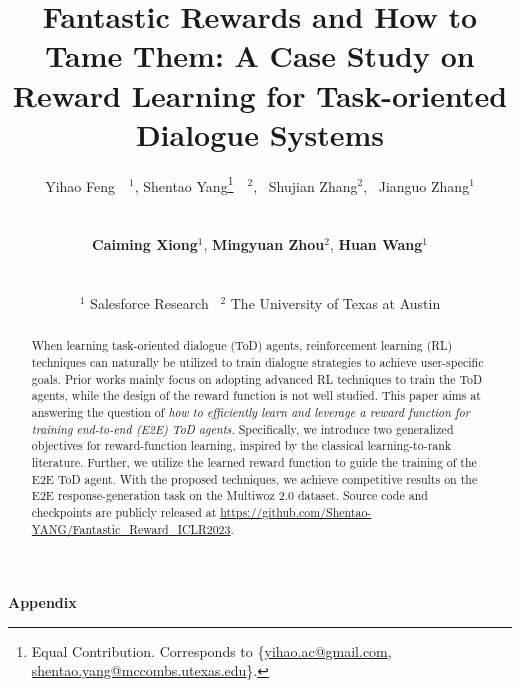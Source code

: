 \documentclass[dvipsnames]{article} %
\title{Fantastic Rewards and How to Tame Them:
A Case Study on Reward Learning for Task-oriented Dialogue Systems}
\author{
\centerline{Yihao Feng\footnotemark[1]~~$^1$, Shentao Yang\thanks{Equal Contribution. Corresponds to \{\href{mailto:yihao.ac@gmail.com}{yihao.ac@gmail.com}, \href{mailto:shentao.yang@mccombs.utexas.edu}{shentao.yang@mccombs.utexas.edu}\}.}~~$^2$,~ Shujian Zhang$^2$,~ Jianguo Zhang$^1$} \\
\centerline{\textbf{Caiming Xiong}$^1$, \textbf{Mingyuan Zhou}$^2$, \textbf{Huan Wang}$^1$}\\
\centerline{$^1$ Salesforce Research~ $^2$ The University of Texas at Austin } 
}
\begin{document}
\maketitle

\vspace{-1em}
\begin{abstract}
\vspace{-.5em}
When learning task-oriented dialogue (ToD) agents, reinforcement learning (RL) techniques can naturally be  utilized to train dialogue strategies to achieve user-specific goals. Prior works mainly focus on adopting advanced RL techniques to train the ToD agents, while the design of the reward function is not well studied. This paper aims at answering the question of \textit{how to efficiently learn and leverage a reward function for training end-to-end (E2E) ToD agents}. Specifically, we introduce two generalized objectives for reward-function learning, inspired by the classical learning-to-rank literature. Further, we utilize the learned reward function to guide the training of the E2E ToD agent. With the proposed techniques, we achieve competitive results on the E2E response-generation task on the Multiwoz 2.0 dataset. 
Source code and checkpoints are publicly released at \href{https://github.com/Shentao-YANG/Fantastic_Reward_ICLR2023}{https://github.com/Shentao-YANG/Fantastic\_Reward\_ICLR2023}.




\end{abstract}











\clearpage




\clearpage
\appendix

\begin{center}
\Large
\textbf{Appendix}
\end{center}


\end{document}
